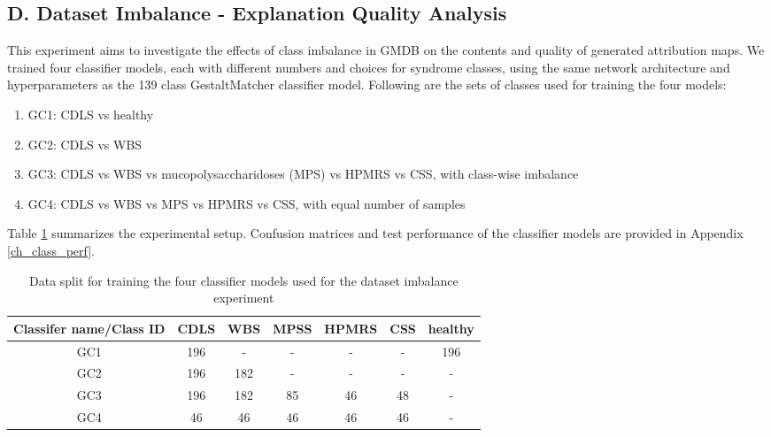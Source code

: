 \documentclass[../report.tex]{subfiles}
\begin{document}
    \subsection{D. Dataset Imbalance - Explanation Quality Analysis}
        \noindent
    This experiment aims to investigate the effects of class imbalance in GMDB on the contents and quality of generated attribution maps. We trained four classifier models, each with different numbers and choices for syndrome classes, using the same network architecture and hyperparameters as the 139 class GestaltMatcher classifier model. Following are the sets of classes used for training the four models:
    \begin{enumerate}
    	\item GC1: CDLS vs healthy 
    	\item GC2: CDLS vs WBS
    	\item GC3: CDLS vs WBS vs mucopolysaccharidoses (MPS) vs HPMRS vs CSS, with class-wise imbalance 
    	\item GC4: CDLS vs WBS vs MPS vs HPMRS vs CSS, with equal number of samples
    \end{enumerate} 
   Table \ref{tab_xai_imb_split} summarizes the experimental setup. Confusion matrices and test performance of the classifier models are provided in Appendix \ref{ch_class_perf}.
    \begin{table}[H]
    	\centering
    	\begin{tabular}{|c|c|c|c|c|c|c|}
    		\hline
    		Classifer name/Class ID & CDLS & WBS & MPSS & HPMRS & CSS & healthy \\ \hline
    		GC1                     & 196  & -   & -    & -     & -   & 196     \\ \hline
    		GC2                     & 196  & 182 & -    & -     & -   & -       \\ \hline
    		GC3                     & 196  & 182 & 85   & 46    & 48  & -       \\ \hline
    		GC4                     & 46   & 46  & 46   & 46    & 46  & -       \\ \hline
    	\end{tabular}
    \caption{Data split for training the four classifier models used for the dataset imbalance experiment}
    \label{tab_xai_imb_split}
    \end{table}
\end{document}
